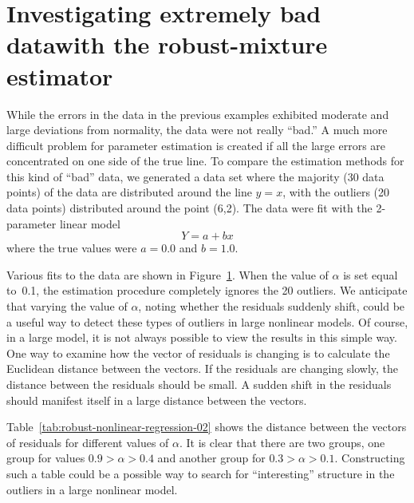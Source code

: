\documentclass{admbmanual}
\begin{document}
\section{Investigating extremely bad data\br with the robust-mixture
estimator}
\label{sec:investigating-bad-data}

While the errors in the data in the previous examples exhibited moderate and
large deviations from normality, the data were not really ``bad.'' A much more
difficult problem for parameter estimation is created if all the large errors
are concentrated on one side of the true line. To compare the estimation methods
for this kind of ``bad'' data, we generated a data set where the majority (30
data points) of the data are distributed around the line $y=x$, with the
outliers (20 data points) distributed around the point (6,2). The data were fit
with the 2-parameter linear model
\begin{equation*}
  Y=a+bx
\end{equation*}
where the true values were $a=0.0$ and $b=1.0$.

Various fits to the data are shown in
Figure~\ref{fig:robust-nonlinear-regression-03}. %
When the value of $\alpha$ is set equal to~0.1, the estimation procedure
completely ignores the 20 outliers. We anticipate that varying the value of
$\alpha$, noting whether the residuals suddenly shift, could be a useful way to
detect these types of outliers in large nonlinear models. Of course, in a large
model, it is not always possible to view the results in this simple way. One way
to examine how the vector of residuals is changing is to calculate the Euclidean
distance between the vectors. If the residuals are changing slowly, the distance
between the residuals should be small. A sudden shift in the residuals should
manifest itself in a large distance between the vectors.
\begin{figure}
  \centering\hskip1pt
   
   \emptycaption{}
   \label{fig:robust-nonlinear-regression-03}
\end{figure}

Table~\ref{tab:robust-nonlinear-regression-02} %
shows the distance between the vectors of residuals for different values of
$\alpha$. It is clear that there are two groups, one group for values
$0.9>\alpha>0.4$ and another group for $0.3>\alpha>0.1$. Constructing such a
table could be a possible way to search for ``interesting'' structure in the
outliers in a large nonlinear model.
\end{document}
